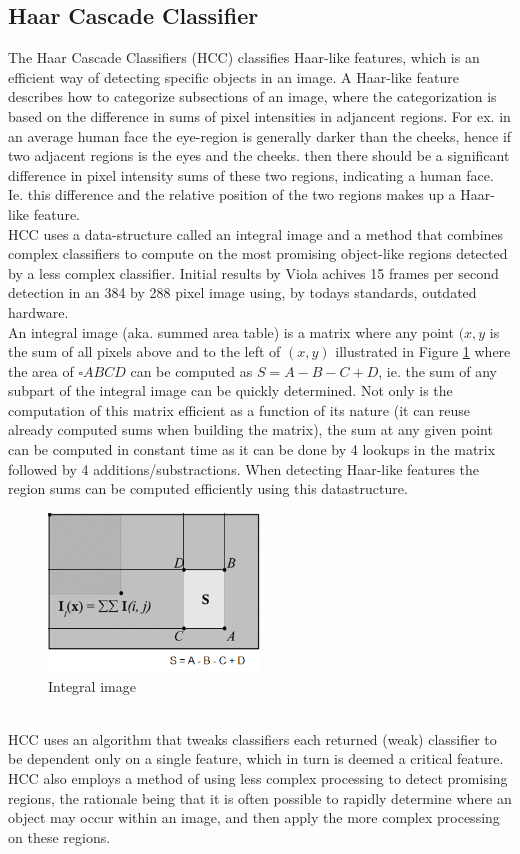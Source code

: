 \subsection{Haar Cascade Classifier}\label{sec:hcc}
%
The Haar Cascade Classifiers (HCC)\cite{viola01,lienhart01,schmidt01,schmidt02} classifies Haar-like features, which is an efficient way of detecting specific objects in an image. A Haar-like feature describes how to categorize subsections of an image, where the categorization is based on the difference in sums of pixel intensities in adjancent regions. For ex. in an average human face the eye-region is generally darker than the cheeks, hence if two adjacent regions is the eyes and the cheeks. then there should be a significant difference in pixel intensity sums of these two regions, indicating a human face. Ie. this difference and the relative position of the two regions makes up a Haar-like feature.\\
HCC uses a data-structure called an integral image and a method that combines complex classifiers to compute on the most promising object-like regions detected by a less complex classifier. Initial results by Viola\cite{viola01} achives 15 frames per second detection in an 384 by 288 pixel image using, by todays standards, outdated hardware.\\
%
An integral image (aka. summed area table) is a matrix where any point $(x,y$ is the sum of all pixels above and to the left of $(x,y)$ illustrated in Figure \ref{fig:integral_img} where the area of $\square ABCD$ can be computed as $S=A-B-C+D$, ie. the sum of any subpart of the integral image can be quickly determined. Not only is the computation of this matrix efficient as a function of its nature (it can reuse already computed sums when building the matrix), the sum at any given point can be computed in constant time as it can be done by 4 lookups in the matrix followed by 4 additions/substractions. When detecting Haar-like features the region sums can be computed efficiently using this datastructure.
%
\begin{figure}[!ht]
     \centering
     \includegraphics[width=0.50\textwidth]{img/integral_image.png}
     \caption{Integral image}\label{fig:integral_img}
\end{figure}\\
%
HCC uses an algorithm that tweaks classifiers  each returned (weak) classifier to be dependent only on a single feature, which in turn is deemed a critical feature.
HCC also employs a method of using less complex processing to detect promising regions, the rationale being that it is often possible to rapidly determine where an object may occur within an image, and then apply the more complex processing on these regions.
%
